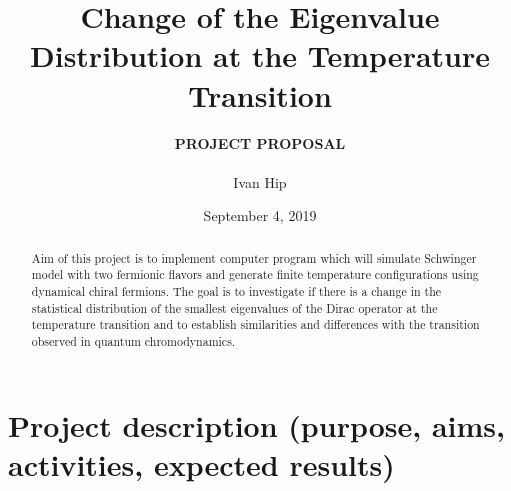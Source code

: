 \documentclass[12pt,a4paper]{article}
\author{\textbf{PROJECT PROPOSAL} \\ \\ Ivan Hip}
\title{Change of the Eigenvalue Distribution at the Temperature Transition}
\date{September 4, 2019}
\begin{document}
\maketitle

\begin{abstract}
Aim of this project is to implement computer program which will simulate Schwinger model with two fermionic flavors and generate finite temperature configurations using dynamical chiral fermions. The goal is to investigate if there is a change in the statistical distribution of the smallest eigenvalues of the Dirac operator at the temperature transition and to establish similarities and differences with the transition observed in quantum chromodynamics.
\end{abstract}

\section{Project description (purpose, aims, activities, expected results)}
\end{document}
